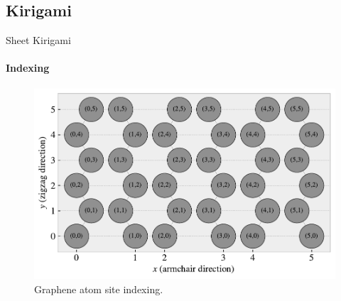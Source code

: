 \documentclass[
	10pt, %
]{beamer}
\renewcommand{\vec}[1]{\mathbf{#1}} %
\begin{document}
\subsection{Kirigami}

	
%
%
\begin{frame}{Sheet Kirigami}
	\framesubtitle{Indexing}
	\vspace*{5mm}
	\begin{figure}[H]
		\centering
		\includegraphics[width=0.7\linewidth]{../thesis/figures/system/atom_indexing.pdf}
		\caption{Graphene atom site indexing.}
	\end{figure}	
\end{frame}
\end{document}

